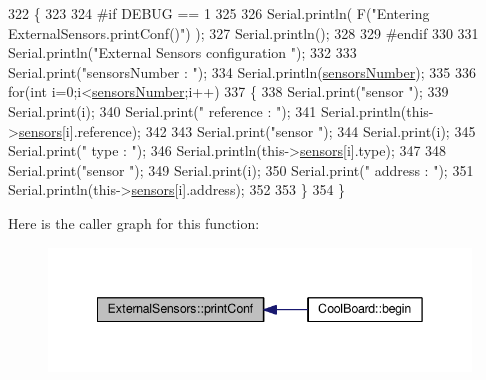 \begin{DoxyCode}
322 \{
323 
324 \textcolor{preprocessor}{#if DEBUG == 1}
325 
326     Serial.println( F(\textcolor{stringliteral}{"Entering ExternalSensors.printConf()"}) );
327     Serial.println();
328 
329 \textcolor{preprocessor}{#endif }
330 
331     Serial.println(\textcolor{stringliteral}{"External Sensors configuration "});
332 
333     Serial.print(\textcolor{stringliteral}{"sensorsNumber : "});
334     Serial.println(\hyperlink{classExternalSensors_a58e4fbf9adeae787d92be5fa33043b5d}{sensorsNumber});
335 
336     \textcolor{keywordflow}{for}(\textcolor{keywordtype}{int} i=0;i<\hyperlink{classExternalSensors_a58e4fbf9adeae787d92be5fa33043b5d}{sensorsNumber};i++)
337     \{
338         Serial.print(\textcolor{stringliteral}{"sensor "});
339         Serial.print(i);
340         Serial.print(\textcolor{stringliteral}{" reference : "});
341         Serial.println(this->\hyperlink{classExternalSensors_a284233f884fcf00154a44740cf1d9e1e}{sensors}[i].reference);
342 
343         Serial.print(\textcolor{stringliteral}{"sensor "});
344         Serial.print(i);
345         Serial.print(\textcolor{stringliteral}{" type : "});
346         Serial.println(this->\hyperlink{classExternalSensors_a284233f884fcf00154a44740cf1d9e1e}{sensors}[i].type);
347                 
348         Serial.print(\textcolor{stringliteral}{"sensor "});
349         Serial.print(i);
350         Serial.print(\textcolor{stringliteral}{" address : "});
351         Serial.println(this->\hyperlink{classExternalSensors_a284233f884fcf00154a44740cf1d9e1e}{sensors}[i].address);
352     
353     \}
354 \}
\end{DoxyCode}
Here is the caller graph for this function\+:
\nopagebreak
\begin{figure}[H]
\begin{center}
\leavevmode
\includegraphics[width=342pt]{classExternalSensors_a78c2bf55084435dd51d3c559b2d3c6f3_icgraph}
\end{center}
\end{figure}
\mbox{\label{classExternalSensors_a53177b81eca3be89508b5511ddcd00fc}} 
